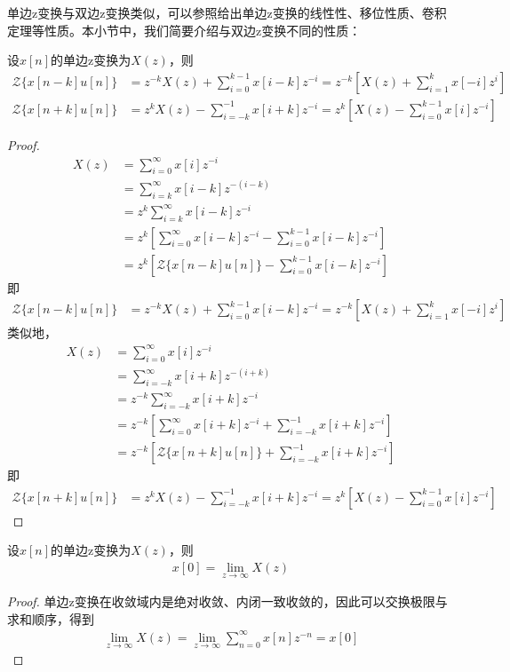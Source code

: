 单边z变换与双边z变换类似，可以参照给出单边z变换的线性性、移位性质、卷积定理等性质。本小节中，我们简要介绍与双边z变换不同的性质：
\begin{proposition}[单边z变换的移位性质]
    设$x[n]$的单边z变换为$X(z)$，则\begin{align*}
    \mathcal{Z}\{x[n-k]u[n]\}&=z^{-k}X(z)+\sum_{i=0}^{k-1}x[i-k]z^{-i}=z^{-k}\left[X(z)+\sum_{i=1}^{k}x[-i]z^{i}\right]\\
    \mathcal{Z}\{x[n+k]u[n]\}&=z^{k}X(z)-\sum_{i=-k}^{-1}x[i+k]z^{-i}=z^{k}\left[X(z)-\sum_{i=0}^{k-1}x[i]z^{-i}\right]
    \end{align*}
\end{proposition}
\begin{proof}
    \begin{align*}
        X(z)&=\sum_{i=0}^{\infty}x[i]z^{-i}\\
        &=\sum_{i=k}^{\infty}x[i-k]z^{-(i-k)}\\
        &=z^{k}\sum_{i=k}^{\infty}x[i-k]z^{-i}\\
        &=z^{k}\left[\sum_{i=0}^{\infty}x[i-k]z^{-i}-\sum_{i=0}^{k-1}x[i-k]z^{-i}\right]\\
        &=z^{k}\left[\mathcal{Z}\{x[n-k]u[n]\}-\sum_{i=0}^{k-1}x[i-k]z^{-i}\right]
    \end{align*}
    即\begin{align*}
    \mathcal{Z}\{x[n-k]u[n]\}&=z^{-k}X(z)+\sum_{i=0}^{k-1}x[i-k]z^{-i}=z^{-k}\left[X(z)+\sum_{i=1}^{k}x[-i]z^{i}\right]
    \end{align*}
    类似地，\begin{align*}
        X(z)&=\sum_{i=0}^{\infty}x[i]z^{-i}\\
        &=\sum_{i=-k}^{\infty}x[i+k]z^{-(i+k)}\\
        &=z^{-k}\sum_{i=-k}^{\infty}x[i+k]z^{-i}\\
        &=z^{-k}\left[\sum_{i=0}^{\infty}x[i+k]z^{-i}+\sum_{i=-k}^{-1}x[i+k]z^{-i}\right]\\
        &=z^{-k}\left[\mathcal{Z}\{x[n+k]u[n]\}+\sum_{i=-k}^{-1}x[i+k]z^{-i}\right]
    \end{align*}
    即\begin{align*}
    \mathcal{Z}\{x[n+k]u[n]\}&=z^{k}X(z)-\sum_{i=-k}^{-1}x[i+k]z^{-i}=z^{k}\left[X(z)-\sum_{i=0}^{k-1}x[i]z^{-i}\right]
    \end{align*}
\end{proof}

\begin{theorem}[单边z变换的初值定理]
    设$x[n]$的单边z变换为$X(z)$，则\begin{align*}
    x[0]=\lim_{z\to\infty}X(z)
    \end{align*}
\end{theorem}
\begin{proof}
    单边z变换在收敛域内是绝对收敛、内闭一致收敛的，因此可以交换极限与求和顺序，得到\begin{align*}
    \lim_{z\to\infty}X(z)=\lim_{z\to\infty}\sum_{n=0}^{\infty}x[n]z^{-n}=x[0]
    \end{align*}
\end{proof}


